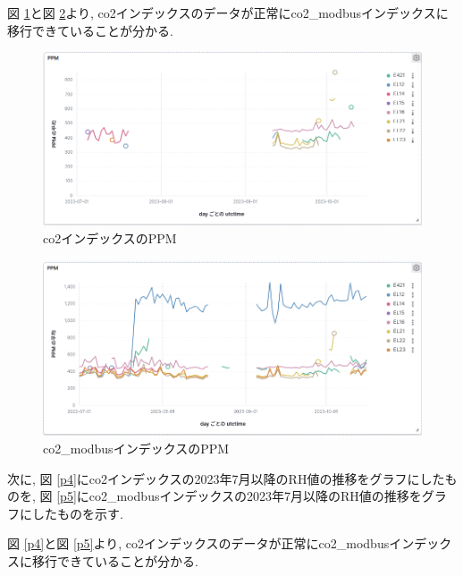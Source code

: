 \documentclass[a4j,12pt,]{jarticle}
\begin{document}
図 \ref{p2}と図 \ref{p3}より, co2インデックスのデータが正常にco2\_modbusインデックスに移行できていることが分かる.

\begin{figure}[H]
  \begin{center}
    \includegraphics[width=160mm]{co2PPM.png}
    \caption{co2インデックスのPPM}
    \label{p2}
  \end{center}
\end{figure}

\begin{figure}[H]
  \begin{center}
    \includegraphics[width=160mm]{co2ModbusPPM.png}
    \caption{co2\_modbusインデックスのPPM}
    \label{p3}
  \end{center}
\end{figure}

次に, 図 \ref{p4}にco2インデックスの2023年7月以降のRH値の推移をグラフにしたものを, 図 \ref{p5}にco2\_modbusインデックスの2023年7月以降のRH値の推移をグラフにしたものを示す.

図 \ref{p4}と図 \ref{p5}より, co2インデックスのデータが正常にco2\_modbusインデックスに移行できていることが分かる.
\end{document}
